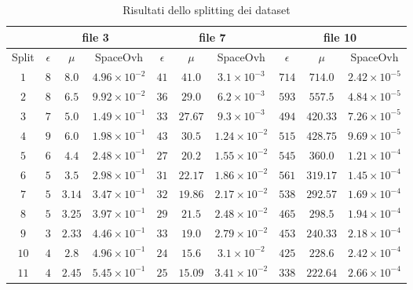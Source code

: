 \begin{center}
	\begin{table}
	\caption{Risultati dello splitting dei dataset}\label{tab:n1}
	\begin{center}
		\begin{tabular}{ c||ccc|ccc|ccc }
		\hline		
		\hline
		&\multicolumn{3}{c}{file 3}&\multicolumn{3}{c}{file 7}&\multicolumn{3}{c}{file 10} \\
		\hline
		Split & $\epsilon$ & $\mu$ & SpaceOvh & $\epsilon$ & $\mu$ & SpaceOvh & $\epsilon$ & $\mu$ & SpaceOvh\\ \hline
		\hline
$1$  & $8$ & $8.0$  & $4.96\times 10^{-2}$   & $41$ & $41.0$ & $3.1\times 10^{-3}$     & $714$ & $714.0$ & $2.42\times 10^{-5}$   \\ 
$2$  & $8$ & $6.5$  & $9.92\times 10^{-2}$   & $36$ & $29.0$ & $6.2\times 10^{-3}$     & $593$ & $557.5$ & $4.84\times 10^{-5}$   \\ 
$3$  & $7$ & $5.0$  & $1.49\times 10^{-1}$   & $33$ & $27.67$ & $9.3\times 10^{-3}$    & $494$ & $420.33$ & $7.26\times 10^{-5}$  \\ 
$4$  & $9$ & $6.0$  & $1.98\times 10^{-1}$   & $43$ & $30.5$ & $1.24\times 10^{-2}$    & $515$ & $428.75$ & $9.69\times 10^{-5}$  \\ 
$5$  & $6$ & $4.4$  & $2.48\times 10^{-1}$   & $27$ & $20.2$ & $1.55\times 10^{-2}$    & $545$ & $360.0$ & $1.21\times 10^{-4}$   \\ 
$6$  & $5$ & $3.5$  & $2.98\times 10^{-1}$   & $31$ & $22.17$ & $1.86\times 10^{-2}$   & $561$ & $319.17$ & $1.45\times 10^{-4}$  \\ 
$7$  & $5$ & $3.14$ & $3.47\times 10^{-1}$   & $32$ & $19.86$ & $2.17\times 10^{-2}$   & $538$ & $292.57$ & $1.69\times 10^{-4}$  \\ 
$8$  & $5$ & $3.25$ & $3.97\times 10^{-1}$   & $29$ & $21.5$ & $2.48\times 10^{-2}$    & $465$ & $298.5$ & $1.94\times 10^{-4}$   \\ 
$9$  & $3$ & $2.33$ & $4.46\times 10^{-1}$   & $33$ & $19.0$ & $2.79\times 10^{-2}$    & $453$ & $240.33$ & $2.18\times 10^{-4}$  \\ 
$10$ & $4$ & $2.8$  & $4.96\times 10^{-1}$   & $24$ & $15.6$ & $3.1\times 10^{-2}$     & $425$ & $228.6$ & $2.42\times 10^{-4}$   \\ 
$11$ & $4$ & $2.45$ & $5.45\times 10^{-1}$   & $25$ & $15.09$ & $3.41\times 10^{-2}$   & $338$ & $222.64$ & $2.66\times 10^{-4}$  \\ 

\end{tabular}
\end{center}
\end{table}
\end{center}
